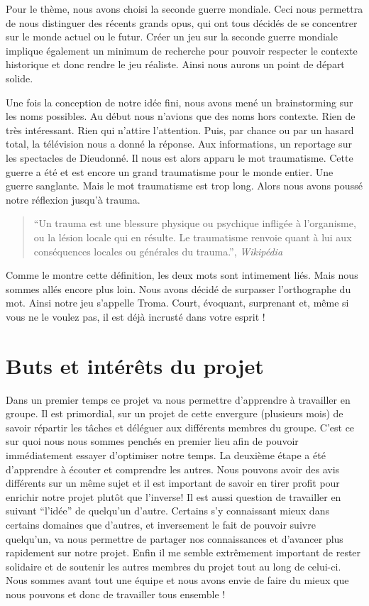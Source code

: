 \documentclass[a4paper, 11pt]{report}
\begin{document}
Pour le thème, nous avons choisi la seconde guerre mondiale. Ceci nous permettra de nous distinguer des récents grands opus, qui ont tous décidés de se concentrer sur le monde actuel ou le futur. Créer un jeu sur la seconde guerre mondiale implique également un minimum de recherche pour pouvoir respecter le contexte historique et donc rendre le jeu réaliste. Ainsi nous aurons un point de départ solide.

Une fois la conception de notre idée fini, nous avons mené un brainstorming sur les noms possibles. Au début nous n'avions que des noms hors contexte. Rien de très intéressant. Rien qui n'attire l'attention. Puis, par chance ou par un hasard total, la télévision nous a donné la réponse. Aux informations, un reportage sur les spectacles de Dieudonné. Il nous est alors apparu le mot traumatisme. Cette guerre a été et est encore un grand traumatisme pour le monde entier. Une guerre sanglante. Mais le mot traumatisme est trop long. Alors nous avons poussé notre réflexion jusqu'à trauma.

\begin{quote}
``Un trauma est une blessure physique ou psychique infligée à l'organisme, ou la lésion locale qui en résulte. Le traumatisme renvoie quant à lui aux conséquences locales ou générales du trauma.'', \emph{Wikipédia}
\end{quote}

Comme le montre cette définition, les deux mots sont intimement liés. Mais nous sommes allés encore plus loin. Nous avons décidé de surpasser l'orthographe du mot. Ainsi notre jeu s'appelle Troma. Court, évoquant, surprenant et, même si vous ne le voulez pas, il est déjà incrusté dans votre esprit !

\newpage
\section{Buts et intérêts du projet}\label{buts-et-intuxe9ruxeats-du-projet}

Dans un premier temps ce projet va nous permettre d'apprendre à travailler en groupe. Il est primordial, sur un projet de cette envergure (plusieurs mois) de savoir répartir les tâches et déléguer aux différents membres du groupe. C'est ce sur quoi nous nous sommes penchés en premier lieu afin de pouvoir immédiatement essayer d'optimiser notre temps. La deuxième étape a été d'apprendre à écouter et comprendre les autres. Nous pouvons avoir des avis différents sur un même sujet et il est important de savoir en tirer profit pour enrichir notre projet plutôt que l'inverse! Il est aussi question de travailler en suivant ``l'idée'' de quelqu'un d'autre. Certains s'y connaissant mieux dans certains domaines que d'autres, et inversement le fait de pouvoir suivre quelqu'un, va nous permettre de partager nos connaissances et d'avancer plus rapidement sur notre projet. Enfin il me semble extrêmement important de rester solidaire et de soutenir les autres membres du projet tout au long de celui-ci. Nous sommes avant tout une équipe et nous avons envie de faire du mieux que nous pouvons et donc de travailler tous ensemble !
\end{document}

